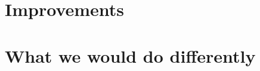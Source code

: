 \section{Improvements}\label{sec:improvements}


\section{What we would do differently}\label{sec:do-differently}
